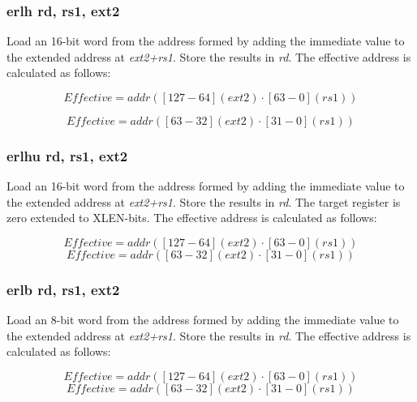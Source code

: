 \documentclass{article}
\begin{document}
\subsubsection{erlh rd, rs1, ext2}

Load an 16-bit word from the address formed by adding the immediate value to the 
extended address at \textit{ext2+rs1}.  Store the results in \textit{rd}.  
The effective address is calculated as follows:

\begin{equation}
Effective = addr([127-64](ext2) \cdot [63-0](rs1))
\end{equation}

\begin{equation}
Effective = addr([63-32](ext2) \cdot [31-0](rs1))
\end{equation}

\subsubsection{erlhu rd, rs1, ext2}

Load an 16-bit word from the address formed by adding the immediate value to the 
extended address at \textit{ext2+rs1}.  Store the results in \textit{rd}.  
 The target register is zero extended to XLEN-bits.  The effective 
address is calculated as follows:

\begin{equation}
Effective = addr([127-64](ext2) \cdot [63-0](rs1))
\end{equation}
\begin{equation}
Effective = addr([63-32](ext2) \cdot [31-0](rs1))
\end{equation}

\subsubsection{erlb rd, rs1, ext2}

Load an 8-bit word from the address formed by adding the immediate value to the 
extended address at \textit{ext2+rs1}.  Store the results in \textit{rd}.  
The effective address is calculated as follows: 

\begin{equation}
Effective = addr([127-64](ext2) \cdot [63-0](rs1))
\end{equation}
\begin{equation}
Effective = addr([63-32](ext2) \cdot [31-0](rs1))
\end{equation}
\end{document}
